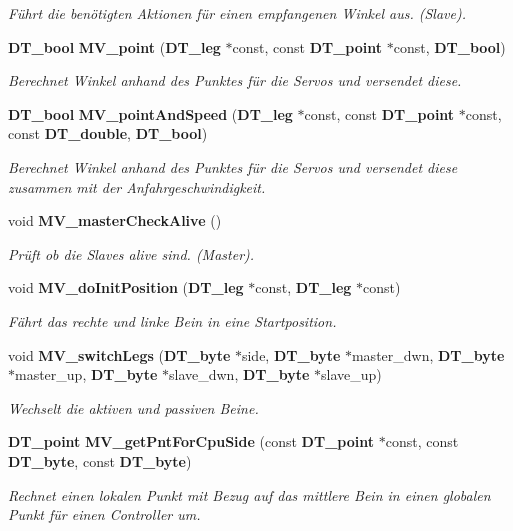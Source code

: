 \begin{DoxyCompactItemize}
\begin{DoxyCompactList}\small\item\em Führt die benötigten Aktionen für einen empfangenen Winkel aus. (Slave). \item\end{DoxyCompactList}\item 
{\bf DT\_\-bool} {\bf MV\_\-point} ({\bf DT\_\-leg} $\ast$const, const {\bf DT\_\-point} $\ast$const, {\bf DT\_\-bool})
\begin{DoxyCompactList}\small\item\em Berechnet Winkel anhand des Punktes für die Servos und versendet diese. \item\end{DoxyCompactList}\item 
{\bf DT\_\-bool} {\bf MV\_\-pointAndSpeed} ({\bf DT\_\-leg} $\ast$const, const {\bf DT\_\-point} $\ast$const, const {\bf DT\_\-double}, {\bf DT\_\-bool})
\begin{DoxyCompactList}\small\item\em Berechnet Winkel anhand des Punktes für die Servos und versendet diese zusammen mit der Anfahrgeschwindigkeit. \item\end{DoxyCompactList}\item 
void {\bf MV\_\-masterCheckAlive} ()
\begin{DoxyCompactList}\small\item\em Prüft ob die Slaves alive sind. (Master). \item\end{DoxyCompactList}\item 
void {\bf MV\_\-doInitPosition} ({\bf DT\_\-leg} $\ast$const, {\bf DT\_\-leg} $\ast$const)
\begin{DoxyCompactList}\small\item\em Fährt das rechte und linke Bein in eine Startposition. \item\end{DoxyCompactList}\item 
void {\bf MV\_\-switchLegs} ({\bf DT\_\-byte} $\ast$side, {\bf DT\_\-byte} $\ast$master\_\-dwn, {\bf DT\_\-byte} $\ast$master\_\-up, {\bf DT\_\-byte} $\ast$slave\_\-dwn, {\bf DT\_\-byte} $\ast$slave\_\-up)
\begin{DoxyCompactList}\small\item\em Wechselt die aktiven und passiven Beine. \item\end{DoxyCompactList}\item 
{\bf DT\_\-point} {\bf MV\_\-getPntForCpuSide} (const {\bf DT\_\-point} $\ast$const, const {\bf DT\_\-byte}, const {\bf DT\_\-byte})
\begin{DoxyCompactList}\small\item\em Rechnet einen lokalen Punkt mit Bezug auf das mittlere Bein in einen globalen Punkt für einen Controller um. \item\end{DoxyCompactList}\end{DoxyCompactItemize}


